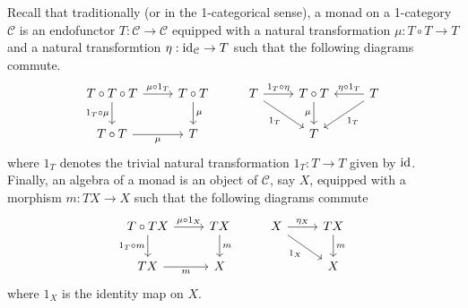 	\begin{defn}\label{Infty_monads}
		Recall that traditionally (or in the 1-categorical sense), a monad on a 1-category $\mathcal{C}$ is an endofunctor $T:\mathcal{C}\to\mathcal{C}$ equipped with a natural transformation $\mu:T\circ T\to T$ and a natural transformtion $\eta:\operatorname{\mathrm{id}}_\mathcal{C}\to T$ such that the following diagrams commute. 
		\[\begin{tikzcd}[ampersand replacement=\&]
			{T\circ T\circ T} \& {T\circ T} \& T \& {T\circ T} \& T \\
			{T\circ T} \& T \&\& T
			\arrow["{\mu\circ 1_T}", from=1-1, to=1-2]
			\arrow["{1_T\circ \mu}"', from=1-1, to=2-1]
			\arrow["\mu", from=1-2, to=2-2]
			\arrow["{1_T\circ\eta}", from=1-3, to=1-4]
			\arrow["{1_T}"', from=1-3, to=2-4]
			\arrow["\mu"', from=1-4, to=2-4]
			\arrow["{\eta\circ 1_T}"', from=1-5, to=1-4]
			\arrow["{1_T}", from=1-5, to=2-4]
			\arrow["\mu"', from=2-1, to=2-2]
		\end{tikzcd}\]
		where $1_T$ denotes the trivial natural transformation $1_T:T\to T$ given by $\operatorname{\mathrm{id}}$. Finally, an algebra of a monad is an object of $\mathcal{C}$, say $X$, equipped with a morphism $m:TX\to X$ such that the following diagrams commute 
		\[\begin{tikzcd}[ampersand replacement=\&]
			{T\circ TX} \& TX \& X \& TX \\
			TX \& X \&\& X
			\arrow["{\mu\circ 1_X}", from=1-1, to=1-2]
			\arrow["{1_T\circ m}"', from=1-1, to=2-1]
			\arrow["m", from=1-2, to=2-2]
			\arrow["{\eta_X}", from=1-3, to=1-4]
			\arrow["{1_X}"', from=1-3, to=2-4]
			\arrow["m", from=1-4, to=2-4]
			\arrow["m"', from=2-1, to=2-2]
		\end{tikzcd}\]
		where $1_X$ is the identity map on $X$. 


\end{defn}
